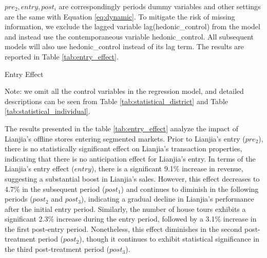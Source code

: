\documentclass[11pt]{article}
\begin{document}
$pre_2, entry, post_i$ are correspondingly periods dummy variables and other settings are the same with Equation \eqref{eq:dynamic}. To mitigate the risk of missing information, we exclude the lagged variable lag(hedonic\_control) from the model and instead use the contemporaneous variable hedonic\_control. All subsequent models will also use hedonic\_control instead of its lag term. The results are reported in Table \ref{tab:entry_effect}.

\begin{table}[htb!]
  \begin{center}
    \begin{scriptsize}
    \caption{Entry Effect}
    \label{tab:entry_effect}
      
    
    Note: we omit all the control variables in the regression model, and detailed descriptions can be seen from Table \ref{tab:statistical_district} and Table \ref{tab:statistical_individual}.
    \end{scriptsize}
  \end{center}
\end{table}

The results presented in the table \ref{tab:entry_effect} analyze the impact of Lianjia's offline stores entering segmented markets. Prior to Lianjia's entry ($pre_2$), there is no statistically significant effect on Lianjia's transaction properties, indicating that there is no anticipation effect for Lianjia's entry. In terms of the Lianjia's entry effect ($entry$), there is a significant 9.1\% increase in revenue, suggesting a substantial boost in Lianjia's sales. However, this effect decreases to 4.7\% in the subsequent period ($post_1$) and continues to diminish in the following periods ($post_2$ and $post_3$), indicating a gradual decline in Lianjia's performance after the initial entry period. Similarly, the number of house tours exhibits a significant 2.3\% increase during the entry period, followed by a 3.1\% increase in the first post-entry period. Nonetheless, this effect diminishes in the second post-treatment period ($post_2$), though it continues to exhibit statistical significance in the third post-treatment period ($post_3$). %
\end{document}
